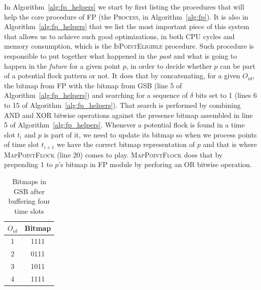 In Algorithm~\ref{alg:fp_helpers} we start by first listing the procedures that will help the core procedure of FP (the
\textsc{Process}, in Algorithm~\ref{alg:fp}). It is also in Algorithm~\ref{alg:fp_helpers} that we list the most
important piece of this system that allows us to achieve such good optimizations, in both CPU cycles and memory
consumption, which is the \textsc{IsPointEligible} procedure. Such procedure is responsible to put together what
happened in the \textit{past} and what is going to happen in the \textit{future} for a given point $p$, in order to
decide whether $p$ can be part of a potential flock pattern or not. It does that by concatenating, for a given $O_{id}$,
the bitmap from FP with the bitmap from GSB (line 5 of Algorithm~\ref{alg:fp_helpers}) and searching for a sequence of
$\delta$ bits set to 1 (lines 6 to 15 of Algorithm~\ref{alg:fp_helpers}). That search is performed by combining AND and
XOR bitwise operations against the presence bitmap assembled in line 5 of Algorithm~\ref{alg:fp_helpers}. Whenever a
potential flock is found in a time slot $t_i$ and $p$ is part of it, we need to update its bitmap so when we process
points of time slot $t_{i+1}$ we have the correct bitmap representation of $p$ and that is where \textsc{MapPointFlock}
(line 20) comes to play. \textsc{MapPointFlock} does that by prepending 1 to $p$'s bitmap in FP module by perforing an
OR bitwise operation.

\begin{table}
    \renewcommand{\arraystretch}{1.3}
    \caption{Bitmaps in GSB after buffering four time slots}
    \label{tab:bitmaps}
    \centering
    \begin{tabular}{c|c}
        \hline
        $O_{id}$ &   Bitmap\\
        \hline
        \hline
        1        &   1111\\
        \hline
        2        &   0111\\
        \hline
        3        &   1011\\
        \hline
        4        &   1111\\
        \hline
    \end{tabular}
\end{table}

